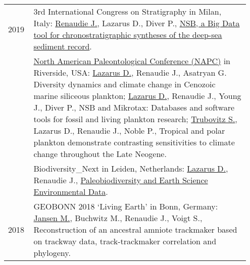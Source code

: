 \documentclass[11pt, a4paper]{article}
\makeatletter
\newcommand\footnoteref[1]{\protected@xdef\@thefnmark{\ref{#1}}\@footnotemark}
\makeatother
\begin{document}
\begin{longtable}{p{0.1\linewidth} P{0.85\linewidth}}
2019 & 3rd International Congress on Stratigraphy in Milan, Italy: \underline{Renaudie J.}, Lazarus D., Diver P., \href{http://plannapus.github.io/data/20190723Potsdam.pdf}{NSB, a Big Data tool for chronostratigraphic syntheses of the deep-sea sediment record}.\\
& \href{https://escholarship.org/uc/item/6r18f8wn}{North American Paleontological Conference (NAPC)} in Riverside, USA: \underline{Lazarus D.}, Renaudie J., Asatryan G. Diversity dynamics and climate change in Cenozoic marine siliceous plankton; \underline{Lazarus D.}, Renaudie J., Young J., Diver P., NSB and Mikrotax: Databases and software tools for fossil and living plankton research; \underline{Trubovitz S.}, Lazarus D., Renaudie J., Noble P., Tropical and polar plankton demonstrate contrasting sensitivities to climate change throughout the Late Neogene.\\
& Biodiversity\_Next in Leiden, Netherlands: \underline{Lazarus D.}, Renaudie J., \href{http://dx.doi.org/10.3897/biss.3.37066}{Paleobiodiversity and Earth Science Environmental Data}.\\
2018 & GEOBONN 2018 `Living Earth' in Bonn, Germany: \underline{Jansen M.}, Buchwitz M., Renaudie J., Voigt S., Reconstruction of an ancestral amniote trackmaker based on trackway data, track-trackmaker correlation and phylogeny.\\

\end{longtable}
\end{document}
